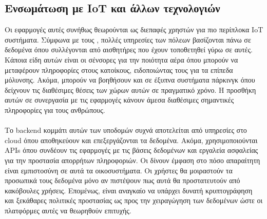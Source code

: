 \subsection{Ενσωμάτωση με IoT και άλλων τεχνολογιών}
Οι εφαρμογές αυτές συνήθως θεωρούνται ως διεπαφές χρηστών για πιο περίπλοκα IoT συστήματα. Σύμφωνα με τους \textcite{aslam2020comprehensive}, πολλές υπηρεσίες των πόλεων βασίζονται πάνω σε δεδομένα όπου συλλέγονται από αισθητήρες που έχουν τοποθετηθεί γύρω σε αυτές. Κάποια είδη αυτών είναι οι σένσορες για την ποιότητα αέρα όπου μπορούν να μεταφέρουν πληροφορίες στους κατοίκους, ειδοποιώντας τους για τα επίπεδα μόλυνσης. Ακόμα, μπορούν να βοηθήσουν και σε έξυπνα συστήματα πάρκινγκ όπου δείχνουν τις διαθέσιμες θέσεις των χώρων αυτών σε πραγματικό χρόνο. Η προσθήκη αυτών σε συνεργασία με τις εφαρμογές κάνουν άμεσα διαθέσιμες σημαντικές πληροφορίες για τους ανθρώπους.
\\
\\
Το backend κομμάτι αυτών των υποδομών συχνά αποτελείται από υπηρεσίες στο cloud όπου αποθηκεύουν και επεξεργάζονται τα δεδομένα. Ακόμα, χρησιμοποιούνται APIs όπου συνδέουν τις εφαρμογές με τις βάσεις δεδομένων και εργαλεία ασφαλείας για την προστασία απορρήτων πληροφοριών. Οι \textcite{angelopoulos2019} δίνουν έμφαση στο πόσο απαραίτητη είναι εμπιστοσύνη σε αυτά τα οικοσυστήματα. Οι χρήστες θα μοιραστούν τα προσωπικά τους δεδομένα μόνο αν πιστέψουν πως αυτά θα προστατευτούν από κακόβουλες χρήσεις. Επομένως, είναι αναγκαίο να υπάρχει δυνατή κρυπτογράφηση και ξεκάθαρες πολιτικές προστασίας ως προς την χειραγώγηση των δεδομένων ώστε οι πλατφόρμες αυτές να θεωρηθούν επιτυχής.

